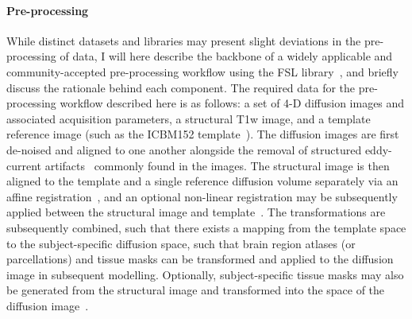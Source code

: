 \paragraph*{Pre-processing}
While distinct datasets and libraries may present slight deviations in the pre-processing of data, I will here describe
the backbone of a widely applicable and community-accepted pre-processing workflow using the FSL
library~\cite{WOOLRICH2009S173,jenkinson2012fsl,Glasser2013-vf}, and briefly discuss the rationale behind each
component. The required data for the pre-processing workflow described here is as follows: a set of 4-D diffusion
images and associated acquisition parameters, a structural T1w image, and a template reference image (such as the
ICBM152 template~\cite{lancaster2007bias}). The diffusion images are first de-noised and aligned to one another
alongside the removal of structured eddy-current artifacts~\cite{andersson2016integrated} commonly found in the images.
The structural image is then aligned to the template and a single reference diffusion volume separately via an affine
registration~\cite{jenkinson2001global}, and an optional non-linear registration may be subsequently applied between
the structural image and template~\cite{jenkinson2012fsl}. The transformations are subsequently combined, such that
there exists a mapping from the template space to the subject-specific diffusion space, such that brain region atlases
(or parcellations) and tissue masks can be transformed and applied to the diffusion image in subsequent modelling.
Optionally, subject-specific tissue masks may also be generated from the structural image and transformed into the
space of the diffusion image~\cite{zhang2001segmentation}.

